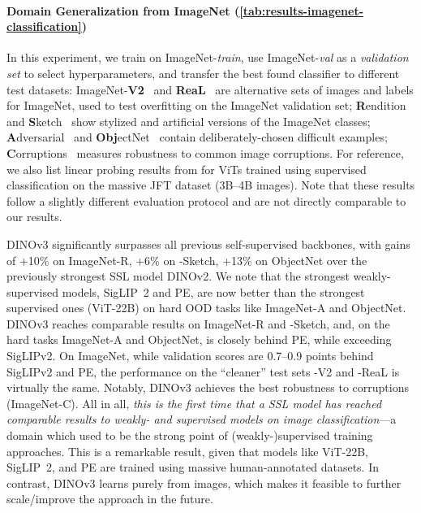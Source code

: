\paragraph[Domain Generalization from ImageNet]{Domain Generalization from ImageNet (\cref{tab:results-imagenet-classification}) }
In this experiment, we train on ImageNet-\emph{train}, use ImageNet-\emph{val} as a \emph{validation set} to select hyperparameters, and transfer the best found classifier to different test datasets: ImageNet-\textbf{V2}~\citep{recht2019imagenet} and \textbf{ReaL}~\citep{beyer2020imagenetreal} are alternative sets of images and labels for ImageNet, used to test overfitting on the ImageNet validation set; \textbf{R}endition~\citep{hendrycks2021many} and \textbf{S}ketch~\citep{wang2019learning} show stylized and artificial versions of the ImageNet classes; \textbf{A}dversarial~\citep{hendrycks2021natural} and \textbf{Obj}ectNet~\citep{barbu2019objectnet} contain deliberately-chosen difficult examples; \textbf{C}orruptions~\citep{hendrycks2019benchmarking} measures robustness to common image corruptions.
For reference, we also list linear probing results from \citet{dehghani2023scaling} for ViTs trained using supervised classification on the massive JFT dataset (3B--4B images).
Note that these results follow a slightly different evaluation protocol and are not directly comparable to our results.

DINOv3 significantly surpasses all previous self-supervised backbones, with gains of +10\% on ImageNet-R, +6\% on -Sketch, +13\% on ObjectNet over the previously strongest SSL model DINOv2.
We note that the strongest weakly-supervised models, SigLIP~2 and PE, are now better than the strongest supervised ones (ViT-22B) on hard OOD tasks like ImageNet-A and ObjectNet. 
DINOv3 reaches comparable results on ImageNet-R and -Sketch, and, on the hard tasks ImageNet-A and ObjectNet, is closely behind PE, while exceeding SigLIPv2.
On ImageNet, while validation scores are 0.7--0.9 points behind SigLIPv2 and PE, the performance on the ``cleaner'' test sets -V2 and -ReaL is virtually the same.
Notably, DINOv3 achieves the best robustness to corruptions (ImageNet-C).
All in all, \emph{this is the first time that a SSL model has reached comparable results to weakly- and supervised models on image classification}---a domain which used to be the strong point of (weakly-)supervised training approaches.
This is a remarkable result, given that models like ViT-22B, SigLIP~2, and PE are trained using massive human-annotated datasets.
In contrast, DINOv3 learns purely from images, which makes it feasible to further scale/improve the approach in the future. 


